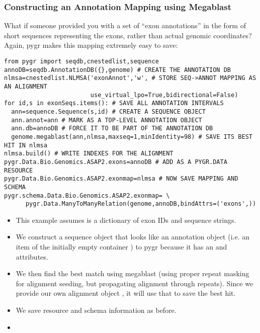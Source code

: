 \documentclass{howto}
\begin{document}
\subsubsection{Constructing an Annotation Mapping using Megablast}
What if someone provided you with a set of ``exon annotations'' in the form
of short sequences representing the exons, rather than actual genomic
coordinates?  Again, pygr makes this mapping extremely easy to save:
\begin{verbatim}
from pygr import seqdb,cnestedlist,sequence
annoDB=seqdb.AnnotationDB({},genome) # CREATE THE ANNOTATION DB
nlmsa=cnestedlist.NLMSA('exonAnnot','w', # STORE SEQ->ANNOT MAPPING AS AN ALIGNMENT
                        use_virtual_lpo=True,bidirectional=False)
for id,s in exonSeqs.items(): # SAVE ALL ANNOTATION INTERVALS
  ann=sequence.Sequence(s,id) # CREATE A SEQUENCE OBJECT
  ann.annot=ann # MARK AS A TOP-LEVEL ANNOTATION OBJECT
  ann.db=annoDB # FORCE IT TO BE PART OF THE ANNOTATION DB
  genome.megablast(ann,nlmsa,maxseq=1,minIdentity=98) # SAVE ITS BEST HIT IN nlmsa
nlmsa.build() # WRITE INDEXES FOR THE ALIGNMENT
pygr.Data.Bio.Genomics.ASAP2.exons=annoDB # ADD AS A PYGR.DATA RESOURCE
pygr.Data.Bio.Genomics.ASAP2.exonmap=nlmsa # NOW SAVE MAPPING AND SCHEMA
pygr.schema.Data.Bio.Genomics.ASAP2.exonmap= \
      pygr.Data.ManyToManyRelation(genome,annoDB,bindAttrs=('exons',))
\end{verbatim}

\begin{itemize}
\item This example assumes  is a dictionary of exon IDs and sequence
strings.

\item We construct a sequence object  that looks like an annotation
object (i.e. an item of the initially empty container \code{annoDB}) 
to pygr because it has an \code{id} and \code{db} attributes.

\item We then find the best match using megablast (using proper repeat masking
for alignment seeding, but propagating alignment through repeats).  Since we provide
our own alignment object \code{nlmsa}, it will use that to save the best hit.

\item We save resource and schema information as before.

\item
\end{itemize}
\end{document}
